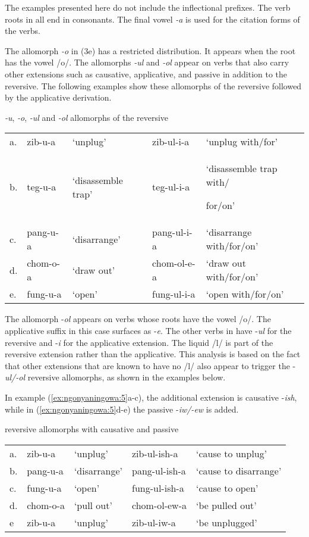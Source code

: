 \documentclass[output=paper]{langsci/langscibook}
\begin{document}
The examples presented here do not include the inflectional prefixes. The verb roots in  all end in consonants. The final vowel \textit{-a} is used for the citation forms of the verbs. 

The allomorph \textit{-o} in (3e) has a restricted distribution. It appears when the root has the vowel /o/. The allomorphs \textit{-ul} and \textit{-ol} appear on verbs that also carry other extensions such as causative, applicative, and passive in addition to the reversive. The following examples show these allomorphs of the reversive followed by the applicative derivation.

\ea\label{ex:ngonyaningowa:4} {\textit{-u}, \textit{-o}, \textit{-ul} and \textit{-ol} allomorphs of the reversive}
\begin{tabularx}{\textwidth}{llllp{3.45cm}}
a.\label{ex:ngonyaningowa:4a} & {zib-u-a} & {‘unplug’} & {zib-ul-i-a}  & {‘unplug with/for’}\\
b.\label{ex:ngonyaningowa:4b} & {teg-u-a} & {‘disassemble trap’} & {teg-ul-i-a} & {‘disassemble trap with/ 

\hfill for/on’}\\
c.\label{ex:ngonyaningowa:4c} & {pang-u-a} & {‘disarrange’} & {pang-ul-i-a} & {‘disarrange with/for/on’}\\
d.\label{ex:ngonyaningowa:4d} & {chom-o-a} & {‘draw out’} & {chom-ol-e-a} & {‘draw out with/for/on’}\\
e.\label{ex:ngonyaningowa:4e} & {fung-u-a} & {‘open’} & {fung-ul-i-a} & {‘open with/for/on’}
\end{tabularx}
\z

The allomorph -\textit{ol} appears on verbs whose roots have the vowel /o/. The applicative suffix in this case surfaces as -\textit{e}. The other verbs in  have -\textit{ul} for the reversive and -\textit{i} for the applicative extension. The liquid /l/ is part of the reversive extension rather than the applicative. This analysis is based on the fact that other extensions that are known to have no /l/ also appear to trigger the -\textit{ul/-ol} reversive allomorphs, as shown in the examples below. 

In example (\ref{ex:ngonyaningowa:5}a-c), the additional extension is causative -\textit{ish}, while in (\ref{ex:ngonyaningowa:5}d-e) the passive -\textit{iw/-ew} is added.

\ea\label{ex:ngonyaningowa:5} {reversive allomorphs with causative and passive}
\begin{tabularx}{\textwidth}{lllll}
a.\label{ex:ngonyaningowa:5a} & {zib-u-a} & {‘unplug’} & {zib-ul-ish-a}& {‘cause to unplug’}\\
b.\label{ex:ngonyaningowa:5b} & {pang-u-a}& {‘disarrange’}& {pang-ul-ish-a} & {‘cause to disarrange’}\\
c.\label{ex:ngonyaningowa:5c} & {fung-u-a} & {‘open’} & {fung-ul-ish-a} & {‘cause to open’}\\
d.\label{ex:ngonyaningowa:5d} & {chom-o-a} & {‘pull out’} & {chom-ol-ew-a} & {‘be pulled out’}\\
e\label{ex:ngonyaningowa:5e} & {zib-u-a} & {‘unplug’} & {zib-ul-iw-a} & {‘be unplugged’} 
\end{tabularx}
\z 
\end{document}
